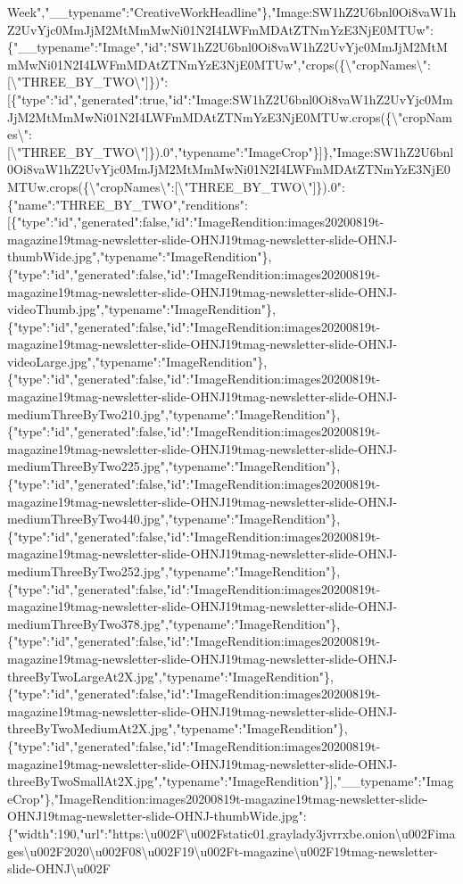 Week","\_\_typename":"CreativeWorkHeadline"\},"Image:SW1hZ2U6bnl0Oi8vaW1hZ2UvYjc0MmJjM2MtMmMwNi01N2I4LWFmMDAtZTNmYzE3NjE0MTUw":\{"\_\_typename":"Image","id":"SW1hZ2U6bnl0Oi8vaW1hZ2UvYjc0MmJjM2MtMmMwNi01N2I4LWFmMDAtZTNmYzE3NjE0MTUw","crops(\{\textbackslash{}"cropNames\textbackslash{}":{[}\textbackslash{}"THREE\_BY\_TWO\textbackslash{}"{]}\})":{[}\{"type":"id","generated":true,"id":"Image:SW1hZ2U6bnl0Oi8vaW1hZ2UvYjc0MmJjM2MtMmMwNi01N2I4LWFmMDAtZTNmYzE3NjE0MTUw.crops(\{\textbackslash{}"cropNames\textbackslash{}":{[}\textbackslash{}"THREE\_BY\_TWO\textbackslash{}"{]}\}).0","typename":"ImageCrop"\}{]}\},"Image:SW1hZ2U6bnl0Oi8vaW1hZ2UvYjc0MmJjM2MtMmMwNi01N2I4LWFmMDAtZTNmYzE3NjE0MTUw.crops(\{\textbackslash{}"cropNames\textbackslash{}":{[}\textbackslash{}"THREE\_BY\_TWO\textbackslash{}"{]}\}).0":\{"name":"THREE\_BY\_TWO","renditions":{[}\{"type":"id","generated":false,"id":"ImageRendition:images20200819t-magazine19tmag-newsletter-slide-OHNJ19tmag-newsletter-slide-OHNJ-thumbWide.jpg","typename":"ImageRendition"\},\{"type":"id","generated":false,"id":"ImageRendition:images20200819t-magazine19tmag-newsletter-slide-OHNJ19tmag-newsletter-slide-OHNJ-videoThumb.jpg","typename":"ImageRendition"\},\{"type":"id","generated":false,"id":"ImageRendition:images20200819t-magazine19tmag-newsletter-slide-OHNJ19tmag-newsletter-slide-OHNJ-videoLarge.jpg","typename":"ImageRendition"\},\{"type":"id","generated":false,"id":"ImageRendition:images20200819t-magazine19tmag-newsletter-slide-OHNJ19tmag-newsletter-slide-OHNJ-mediumThreeByTwo210.jpg","typename":"ImageRendition"\},\{"type":"id","generated":false,"id":"ImageRendition:images20200819t-magazine19tmag-newsletter-slide-OHNJ19tmag-newsletter-slide-OHNJ-mediumThreeByTwo225.jpg","typename":"ImageRendition"\},\{"type":"id","generated":false,"id":"ImageRendition:images20200819t-magazine19tmag-newsletter-slide-OHNJ19tmag-newsletter-slide-OHNJ-mediumThreeByTwo440.jpg","typename":"ImageRendition"\},\{"type":"id","generated":false,"id":"ImageRendition:images20200819t-magazine19tmag-newsletter-slide-OHNJ19tmag-newsletter-slide-OHNJ-mediumThreeByTwo252.jpg","typename":"ImageRendition"\},\{"type":"id","generated":false,"id":"ImageRendition:images20200819t-magazine19tmag-newsletter-slide-OHNJ19tmag-newsletter-slide-OHNJ-mediumThreeByTwo378.jpg","typename":"ImageRendition"\},\{"type":"id","generated":false,"id":"ImageRendition:images20200819t-magazine19tmag-newsletter-slide-OHNJ19tmag-newsletter-slide-OHNJ-threeByTwoLargeAt2X.jpg","typename":"ImageRendition"\},\{"type":"id","generated":false,"id":"ImageRendition:images20200819t-magazine19tmag-newsletter-slide-OHNJ19tmag-newsletter-slide-OHNJ-threeByTwoMediumAt2X.jpg","typename":"ImageRendition"\},\{"type":"id","generated":false,"id":"ImageRendition:images20200819t-magazine19tmag-newsletter-slide-OHNJ19tmag-newsletter-slide-OHNJ-threeByTwoSmallAt2X.jpg","typename":"ImageRendition"\}{]},"\_\_typename":"ImageCrop"\},"ImageRendition:images20200819t-magazine19tmag-newsletter-slide-OHNJ19tmag-newsletter-slide-OHNJ-thumbWide.jpg":\{"width":190,"url":"https:\textbackslash{}u002F\textbackslash{}u002Fstatic01.graylady3jvrrxbe.onion\textbackslash{}u002Fimages\textbackslash{}u002F2020\textbackslash{}u002F08\textbackslash{}u002F19\textbackslash{}u002Ft-magazine\textbackslash{}u002F19tmag-newsletter-slide-OHNJ\textbackslash{}u002F
